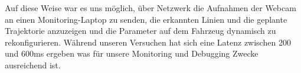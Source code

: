 Auf diese Weise war es uns m\"oglich, \"uber Netzwerk die Aufnahmen der Webcam an einen Monitoring-Laptop zu senden, die erkannten Linien und die geplante Trajektorie anzuzeigen und die Parameter auf dem Fahrzeug dynamisch zu rekonfigurieren. W\"ahrend unseren Versuchen hat sich eine Latenz zwischen 200 und 600ms ergeben was f\"ur unsere Monitoring und Debugging Zwecke ausreichend ist.